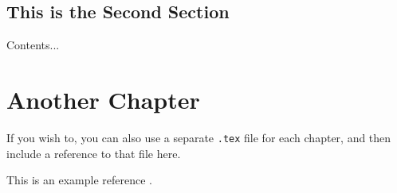\section{This is the Second Section}
Contents...

\chapter{Another Chapter} \label{sec: another_chap}
If you wish to, you can also use a separate \texttt{.tex} file for each chapter, and then include a reference to that file here.



  
  

This is an example reference \cite{sorg2010linear}.

\renewcommand{\bibname}{References}




